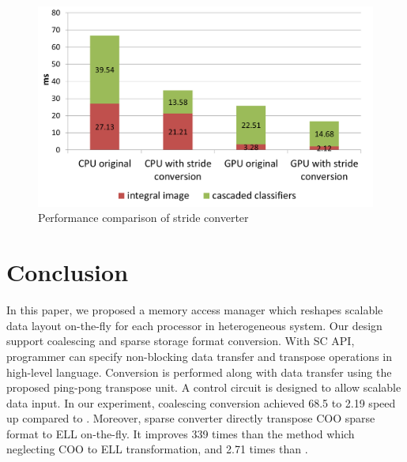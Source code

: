 \documentclass[10pt,journal,compsoc]{IEEEtran}
\begin{document}
 \begin{figure}[tb]
 \begin{center}
 \graphicspath{{picture/}}
 \includegraphics[scale=0.35]{facedetection}
 \caption{Performance comparison of stride converter }
 \label{fig:sparse_total_performance}
 \end{center}
 \end{figure}


\section{Conclusion}
\label{conclusion}

In this paper,
we proposed a memory access manager which reshapes scalable data layout on-the-fly for each processor in heterogeneous system. Our design support coalescing and sparse storage format conversion. With SC API, programmer can specify non-blocking data transfer and transpose operations in high-level language. Conversion is performed along with data transfer using the proposed ping-pong transpose unit. A control circuit is designed to allow scalable data input.
In our experiment, coalescing conversion achieved 68.5 to 2.19 speed up compared to \cite{ASTA}. Moreover, sparse converter directly transpose COO sparse format to ELL on-the-fly. It improves 339 times than the method which neglecting COO to ELL transformation, and 2.71 times than \cite{Cusp}.
\end{document}
